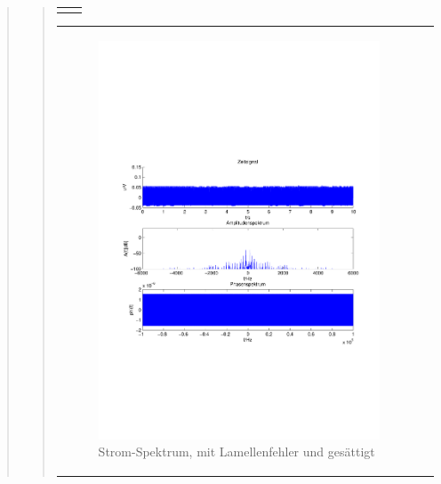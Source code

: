 \begin{quote}
\begin{quote}
\begin{center}
\begin{tabular}{ll}
\begin{minipage}{0.6\textwidth}
                    \end{minipage}
    
                \end{tabular}
                \end{center}
                
                \begin{center}
                \begin{tabular}{ll}
    
                \hspace{-8em}
                    \begin{minipage}{0.6\textwidth}
    
                        \begin{figure}[H]
                            \label{fig:}
                            \includegraphics[scale=0.4, trim = 2cm 6cm 1cm
                            7.5cm,
                            clip]{./Bilder/Termin8/lamellenfehler_gesaettig_Spektrum.pdf}
                            \caption{Strom-Spektrum, mit Lamellenfehler und
                            gesättigt}
                        \end{figure}
    

\end{minipage}
\end{tabular}
\end{center}
\end{quote}
\end{quote}
